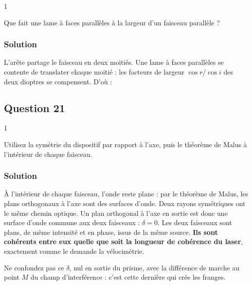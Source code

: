 \documentclass[11pt,a4paper]{article}
\newcommand{\equationajustee}[1]{%
  \sbox{\boiteequation}{$\displaystyle #1$}%
  \ifdim\wd\boiteequation>\linewidth
    \[\resizebox{\linewidth}{!}{\usebox{\boiteequation}}\]%
  \else
    \[#1\]%
  \fi}
\begin{document}
\begin{indication}{1}

Que fait une lame à faces parallèles à la largeur d'un faisceau parallèle ?

\end{indication}

\hypertarget{solution-19}{%
\subsubsection{Solution}\label{solution-19}}

L'arête partage le faisceau en deux moitiés. Une lame à faces parallèles se contente de translater chaque moitié : les facteurs de largeur \(\cos r/\cos i\) des deux dioptres se compensent. D'où :

\equationajustee{\boxed{d_f = \frac{d'_0}{2}}}

\hypertarget{question-21}{%
\subsection{Question 21}\label{question-21}}

\begin{indication}{1}

Utilisez la symétrie du dispositif par rapport à l'axe, puis le théorème de Malus à l'intérieur de chaque faisceau.

\end{indication}

\hypertarget{solution-20}{%
\subsubsection{Solution}\label{solution-20}}

À l'intérieur de chaque faisceau, l'onde reste plane : par le théorème de Malus, les plans orthogonaux à l'axe sont des surfaces d'onde. Deux rayons symétriques ont le même chemin optique. Un plan orthogonal à l'axe en sortie est donc une surface d'onde commune aux deux faisceaux : \(\boxed{\delta = 0}\). Les deux faisceaux sont plans, de même intensité et en phase, issus de la même source. \textbf{Ils sont cohérents entre eux quelle que soit la longueur de cohérence du laser}, exactement comme le demande la vélocimétrie.

\begin{piege}

Ne confondez pas ce \(\delta\), nul en sortie du prisme, avec la différence de marche au point \(M\) du champ d'interférence : c'est cette dernière qui crée les franges.

\end{piege}
\end{document}
